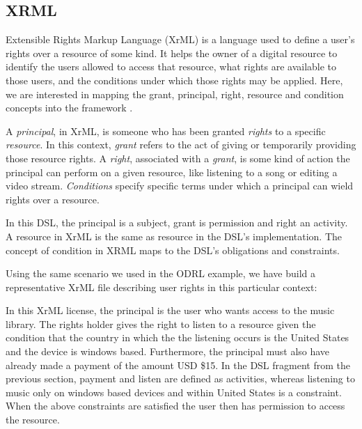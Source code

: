 \subsection{XRML}\label{sec:model-xrml}
Extensible Rights Markup Language (XrML) is a language used to define a user's rights over a resource of some kind. It helps the owner of a digital resource to identify the users allowed to access that resource, what rights are available to those users, and the conditions under which those rights may be applied. Here, we are interested in mapping the grant, principal, right, resource and condition concepts into the framework \cite{XrML-spec}.

A \emph{principal}, in XrML, is someone who has been granted \emph{rights} to a specific \emph{resource}.  In this context, \emph{grant} refers to the act of giving or temporarily providing those resource rights.  A \emph{right}, associated with a \emph{grant}, is some kind of action the principal can perform on a given resource, like listening to a song or editing a video stream.  \emph{Conditions} specify specific terms under which a principal can wield rights over a resource.

In this DSL, the principal is a subject, grant is permission and right an activity. A resource in XrML is the same as resource in the DSL's implementation. The concept of condition in XRML maps to the DSL's obligations and constraints.

Using the same scenario we used in the ODRL example, we have build a representative XrML file describing user rights in this particular context:



In this XrML license, the principal is the user who wants access to the music library. The rights holder gives the right to listen to a resource given the condition that the country in which the the listening occurs is the United States and the device is windows based. Furthermore, the principal must also have already made a payment of the amount USD \$15.  In the DSL fragment from the previous section, payment and listen are defined as activities, whereas listening to music only on windows based devices and within United States is a constraint. When the above constraints are satisfied the user then has permission to access the resource.
